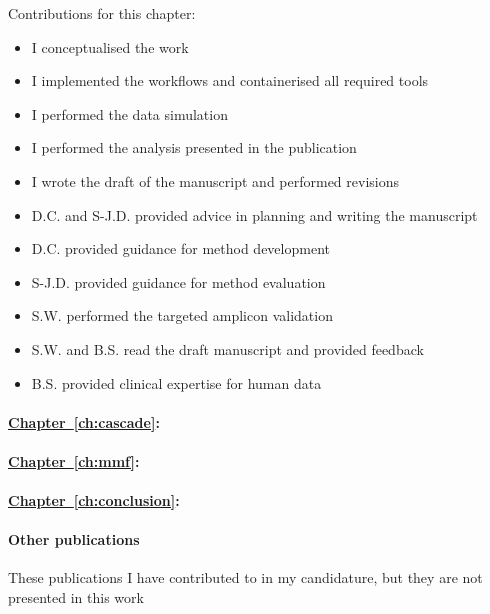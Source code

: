 {Contributions for this chapter:
\begin{itemize}
	\item I conceptualised the work
	\item I implemented the workflows and containerised all required tools
	\item I performed the data simulation
	\item I performed the analysis presented in the publication
	
	\item I wrote the draft of the manuscript and performed revisions
	\item D.C. and S-J.D. provided advice in planning and writing the manuscript
	\item D.C. provided guidance for method development
	\item S-J.D. provided guidance for method evaluation
	\item S.W. performed the targeted amplicon validation
	\item S.W. and  B.S. read the draft manuscript and provided feedback
	\item B.S. provided clinical expertise for human data
	
\end{itemize}



\paragraph*{\hyperref[ch:cascade]{Chapter~\ref*{ch:cascade}}:} 


\paragraph*{\hyperref[ch:mmf]{Chapter~\ref*{ch:mmf}}:}

\paragraph*{\hyperref[ch:conclusion]{Chapter~\ref*{ch:conclusion}}:}


\paragraph*{Other publications} These publications I have contributed to in my candidature, but they are not presented in this work

}
